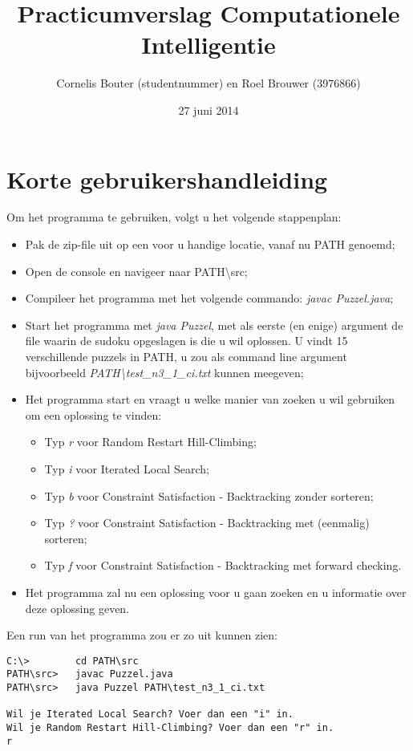 \documentclass[]{report}
\title{Practicumverslag Computationele Intelligentie}
\author{Cornelis Bouter (studentnummer) en Roel Brouwer (3976866)}
\date{27 juni 2014}
\begin{document}
\maketitle

\chapter{Korte gebruikershandleiding}
Om het programma te gebruiken, volgt u het volgende stappenplan:
\begin{itemize}
\item Pak de zip-file uit op een voor u handige locatie, vanaf nu PATH genoemd;
\item Open de console en navigeer naar PATH\textbackslash src;
\item Compileer het programma met het volgende commando: \textit{javac Puzzel.java};
\item Start het programma met \textit{java Puzzel}, met als eerste (en enige) argument de file waarin de sudoku opgeslagen is die u wil oplossen. U vindt 15 verschillende puzzels in PATH, u zou als command line argument bijvoorbeeld \textit{PATH\textbackslash test\_n3\_1\_ci.txt} kunnen meegeven;
\item Het programma start en vraagt u welke manier van zoeken u wil gebruiken om een oplossing te vinden:
\begin{itemize}
\item Typ \textit{r} voor Random Restart Hill-Climbing;
\item Typ \textit{i} voor Iterated Local Search;
\item Typ \textit{b} voor Constraint Satisfaction - Backtracking zonder sorteren;
\item Typ \textit{?} voor Constraint Satisfaction - Backtracking met (eenmalig) sorteren;
\item Typ \textit{f} voor Constraint Satisfaction - Backtracking met forward checking.
\end{itemize}
\item Het programma zal nu een oplossing voor u gaan zoeken en u informatie over deze oplossing geven.
\end{itemize}
Een run van het programma zou er zo uit kunnen zien:

\begin{minipage}{\textwidth}
\begin{lstlisting}
C:\>		cd PATH\src
PATH\src>	javac Puzzel.java
PATH\src>	java Puzzel PATH\test_n3_1_ci.txt

Wil je Iterated Local Search? Voer dan een "i" in.
Wil je Random Restart Hill-Climbing? Voer dan een "r" in.
r
\end{lstlisting}
\end{minipage}
\end{document}
